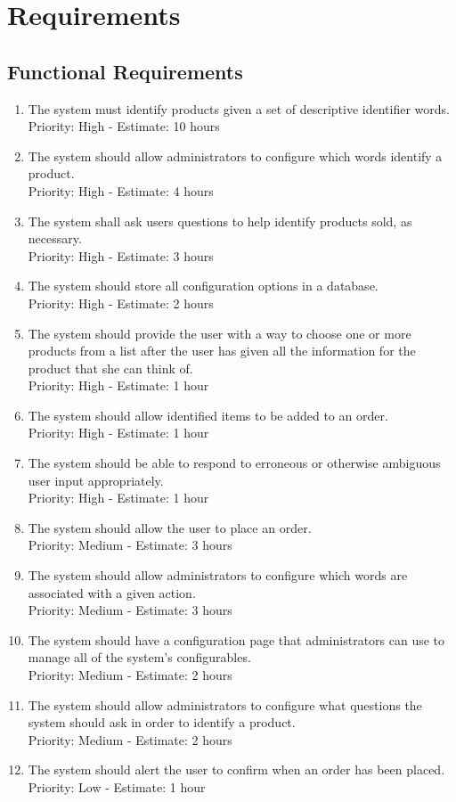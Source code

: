 \documentclass[11pt, titlepage]{article}
\author{Graeme Douglas (76316090)}
\begin{document}
\section{Requirements}
\subsection{Functional Requirements}
\begin{enumerate}
\item The system must identify products given a set of descriptive
identifier words.
\\ Priority: High - Estimate: 10 hours
\item The system should allow administrators to configure which words identify
a product.
\\ Priority: High - Estimate: 4 hours
\item The system shall ask users questions to help identify
products sold, as necessary.
\\ Priority: High - Estimate: 3 hours
\item The system should store all configuration options in a database.
\\ Priority: High - Estimate: 2 hours
\item The system should provide the user with a way to choose one or more
products from a list after the user has given all the information for the
product that she can think of.
\\ Priority: High - Estimate: 1 hour
\item The system should allow identified items to be added to an order.
\\ Priority: High - Estimate: 1 hour
\item The system should be able to respond to erroneous or otherwise ambiguous
user input appropriately.
\\ Priority: High - Estimate: 1 hour
\item The system should allow the user to place an order.
\\ Priority: Medium - Estimate: 3 hours
\item The system should allow administrators to configure which words are
associated with a given action.
\\ Priority: Medium - Estimate: 3 hours
\item The system should have a configuration page that administrators can use
to manage all of the system's configurables.
\\ Priority: Medium - Estimate: 2 hours
\item The system should allow administrators to configure what questions the
system should ask in order to identify a product.
\\ Priority: Medium - Estimate: 2 hours
\item The system should alert the user to confirm when an order has been placed.
\\ Priority: Low - Estimate: 1 hour
\end{enumerate}
\end{document}
